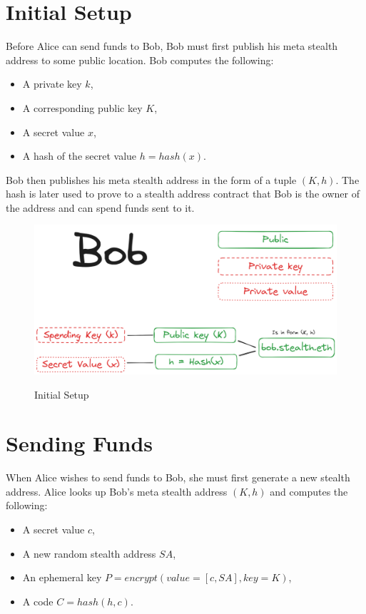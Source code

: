 \section{Initial Setup}

Before Alice can send funds to Bob, Bob must first publish his meta stealth
address to some public location. Bob computes the following:

\begin{itemize}
	\item A private key $k$,
	\item A corresponding public key $K$,
	\item A secret value $x$,
	\item A hash of the secret value $h = hash(x)$.
\end{itemize}

Bob then publishes his meta stealth address in the form of a tuple $(K, h)$.
The hash is later used to prove to a stealth address contract that Bob is the
owner of the address and can spend funds sent to it.

\begin{figure}[h]
    \centering
    \includegraphics[scale=0.30]{assets/images/initial-setup.png}
    \caption{Initial Setup}
    \label{fig:initial-setup}
	\cite{ButerinIncompleteGuide}
    \vspace{0.5cm}
\end{figure}

\section{Sending Funds}

When Alice wishes to send funds to Bob, she must first generate a new stealth
address. Alice looks up Bob's meta stealth address $(K, h)$ and computes the
following:

\begin{itemize}
	\item A secret value $c$,
	\item A new random stealth address $SA$,
	\item An ephemeral key $P = encrypt(value=[c, SA], key=K)$,
	\item A code $C = hash(h, c)$.
\end{itemize}

